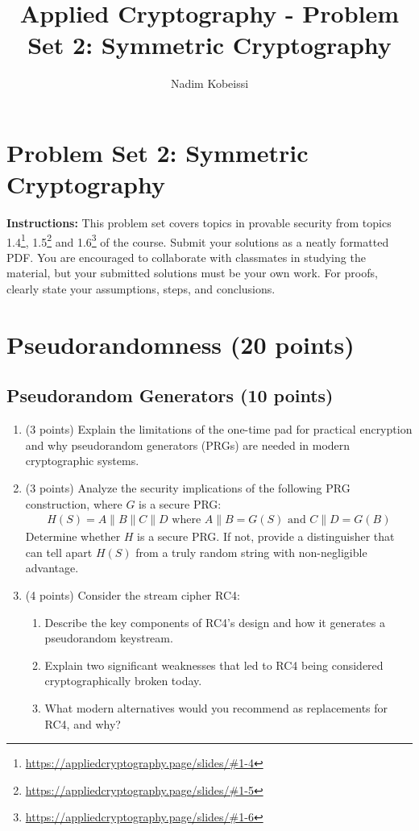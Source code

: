 \documentclass[10pt,a4paper,american]{exam}
\title{Applied Cryptography - Problem Set 2: Symmetric Cryptography}
\author{Nadim Kobeissi}
\begin{document}
\classhandoutheader
\section*{Problem Set 2: Symmetric Cryptography}

\begin{tcolorbox}[colframe=OliveGreen!30!white,colback=OliveGreen!5!white]
	\textbf{Instructions:} This problem set covers topics in provable security from topics 1.4\footnote{\url{https://appliedcryptography.page/slides/\#1-4}}, 1.5\footnote{\url{https://appliedcryptography.page/slides/\#1-5}} and 1.6\footnote{\url{https://appliedcryptography.page/slides/\#1-6}} of the course. Submit your solutions as a neatly formatted PDF. You are encouraged to collaborate with classmates in studying the material, but your submitted solutions must be your own work. For proofs, clearly state your assumptions, steps, and conclusions.
\end{tcolorbox}

\section{Pseudorandomness (20 points)}

\subsection{Pseudorandom Generators (10 points)}

\begin{enumerate}
	\item (3 points) Explain the limitations of the one-time pad for practical encryption and why pseudorandom generators (PRGs) are needed in modern cryptographic systems.

	\item (3 points) Analyze the security implications of the following PRG construction, where $G$ is a secure PRG:
	      \begin{align*}
		      H(S) = A \| B \| C \| D \text{ where } A \| B = G(S) \text{ and } C \| D = G(B)
	      \end{align*}
	      Determine whether $H$ is a secure PRG. If not, provide a distinguisher that can tell apart $H(S)$ from a truly random string with non-negligible advantage.

	\item (4 points) Consider the stream cipher RC4:
	      \begin{enumerate}
		      \item Describe the key components of RC4's design and how it generates a pseudorandom keystream.
		      \item Explain two significant weaknesses that led to RC4 being considered cryptographically broken today.
		      \item What modern alternatives would you recommend as replacements for RC4, and why?
	      \end{enumerate}
\end{enumerate}
\end{document}
